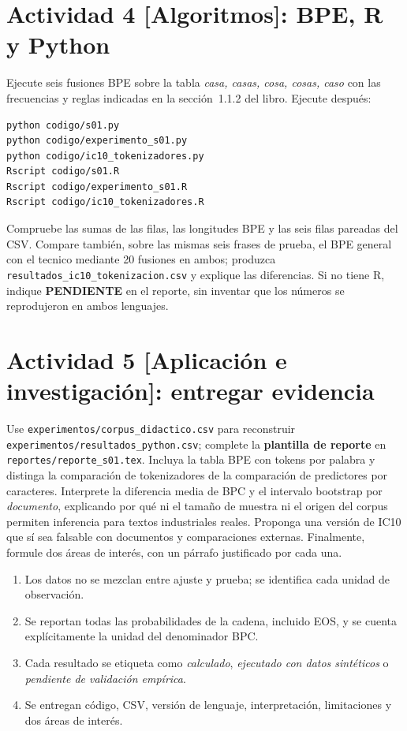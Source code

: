 \section*{Actividad 4 [Algoritmos]: BPE, R y Python}
Ejecute seis fusiones BPE sobre la tabla \emph{casa, casas, cosa, cosas,
caso} con las frecuencias y reglas indicadas en la sección~1.1.2 del libro. Ejecute después:
\begin{verbatim}
python codigo/s01.py
python codigo/experimento_s01.py
python codigo/ic10_tokenizadores.py
Rscript codigo/s01.R
Rscript codigo/experimento_s01.R
Rscript codigo/ic10_tokenizadores.R
\end{verbatim}
Compruebe las sumas de las filas, las longitudes BPE y las seis filas
pareadas del CSV. Compare también, sobre las mismas seis frases
de prueba, el BPE general con el tecnico mediante 20 fusiones en ambos;
produzca \texttt{resultados\_ic10\_tokenizacion.csv} y explique las diferencias.
Si no tiene R, indique \textbf{PENDIENTE} en el reporte,
sin inventar que los números se reprodujeron en ambos lenguajes.
\section*{Actividad 5 [Aplicación e investigación]: entregar evidencia}
Use \nolinkurl{experimentos/corpus_didactico.csv} para reconstruir
\nolinkurl{experimentos/resultados_python.csv}; complete la
\textbf{plantilla de reporte} en \texttt{reportes/reporte\_s01.tex}.
Incluya la tabla BPE con tokens por palabra y distinga la comparación
de tokenizadores de la comparación de predictores por caracteres.
Interprete la diferencia media de BPC y el intervalo bootstrap por
\emph{documento}, explicando por qué ni el tamaño de muestra ni el origen
del corpus permiten inferencia para textos industriales reales.
Proponga una versión de IC10 que sí sea falsable con documentos y
comparaciones externas. Finalmente, formule dos áreas de interés,
con un párrafo justificado por cada una.
\begin{verificacion}
\begin{enumerate}
\item Los datos no se mezclan entre ajuste y prueba; se identifica cada
unidad de observación.
\item Se reportan todas las probabilidades de la cadena, incluido EOS,
y se cuenta explícitamente la unidad del denominador BPC.
\item Cada resultado se etiqueta como \emph{calculado}, \emph{ejecutado
con datos sintéticos} o \emph{pendiente de validación empírica}.
\item Se entregan código, CSV, versión de lenguaje, interpretación,
limitaciones y dos áreas de interés.
\end{enumerate}
\end{verificacion}
